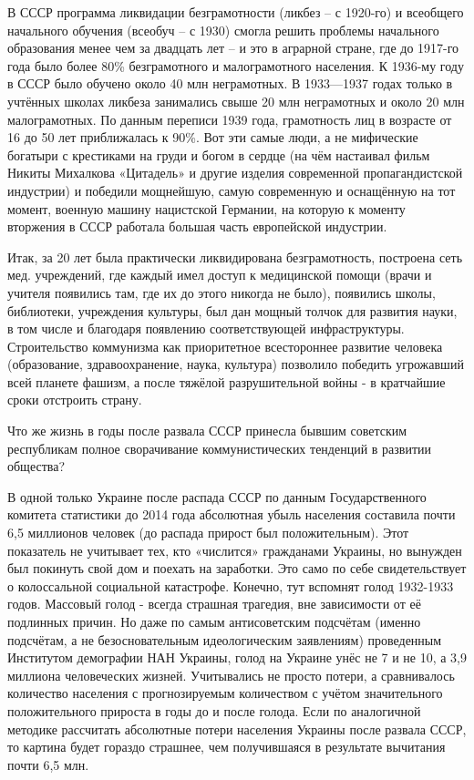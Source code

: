 \documentclass[12pt,a4paper,openany]{book}
\begin{document}
В СССР программа ликвидации безграмотности (ликбез – с 1920-го) и всеобщего начального обучения (всеобуч – с 1930) смогла решить проблемы начального образования менее чем за двадцать лет – и это в аграрной стране, где до 1917-го года было более 80\% безграмотного и малограмотного населения. К 1936-му году в СССР было обучено около 40 млн неграмотных. В 1933—1937 годах только в учтённых школах ликбеза занимались свыше 20 млн неграмотных и около 20 млн малограмотных. По данным переписи 1939 года, грамотность лиц в возрасте от 16 до 50 лет приближалась к 90\%. Вот эти самые люди, а не мифические богатыри с крестиками на груди и богом в сердце (на чём настаивал фильм Никиты Михалкова «Цитадель» и другие изделия современной пропагандистской индустрии) и победили мощнейшую, самую современную и оснащённую на тот момент, военную машину нацистской Германии, на которую к моменту вторжения в СССР работала большая часть европейской индустрии.

Итак, за 20 лет была практически ликвидирована безграмотность, построена сеть мед. учреждений, где каждый имел доступ к медицинской помощи (врачи и учителя появились там, где их до этого никогда не было), появились школы, библиотеки, учреждения культуры, был дан мощный толчок для развития науки, в том числе и благодаря появлению соответствующей инфраструктуры. Строительство коммунизма как приоритетное всестороннее развитие человека (образование, здравоохранение, наука, культура) позволило победить угрожавший всей планете фашизм, а после тяжёлой разрушительной войны - в кратчайшие сроки отстроить страну.

Что же жизнь в годы после развала СССР принесла бывшим советским республикам полное сворачивание коммунистических тенденций в развитии общества?

В одной только Украине после распада СССР по данным Государственного комитета статистики до 2014 года абсолютная убыль населения составила почти 6,5 миллионов человек (до распада прирост был положительным). Этот показатель не учитывает тех, кто «числится» гражданами Украины, но вынужден был покинуть свой дом и поехать на заработки. Это само по себе свидетельствует о колоссальной социальной катастрофе. Конечно, тут вспомнят голод 1932-1933 годов. Массовый голод - всегда страшная трагедия, вне зависимости от её подлинных причин. Но даже по самым антисоветским подсчётам (именно подсчётам, а не безосновательным идеологическим заявлениям) проведенным Институтом демографии НАН Украины, голод на Украине унёс не 7 и не 10, а 3,9 миллиона человеческих жизней. Учитывались не просто потери, а сравнивалось количество населения с прогнозируемым количеством с учётом значительного положительного прироста в годы до и после голода. Если по аналогичной методике рассчитать абсолютные потери населения Украины после развала СССР, то картина будет гораздо страшнее, чем получившаяся в результате вычитания почти 6,5 млн.
\end{document}
